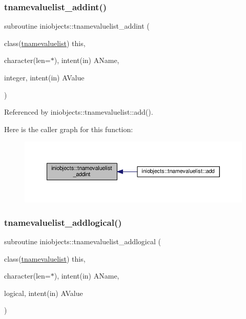 \subsubsection{\texorpdfstring{tnamevaluelist\+\_\+addint()}{tnamevaluelist\_addint()}}
{\footnotesize\ttfamily subroutine iniobjects\+::tnamevaluelist\+\_\+addint (\begin{DoxyParamCaption}\item[{class(\mbox{\hyperlink{structiniobjects_1_1tnamevaluelist}{tnamevaluelist}})}]{this,  }\item[{character(len=$\ast$), intent(in)}]{A\+Name,  }\item[{integer, intent(in)}]{A\+Value }\end{DoxyParamCaption})\hspace{0.3cm}{\ttfamily [private]}}



Referenced by iniobjects\+::tnamevaluelist\+::add().

Here is the caller graph for this function\+:
\nopagebreak
\begin{figure}[H]
\begin{center}
\leavevmode
\includegraphics[width=350pt]{namespaceiniobjects_a4c60c5afba93a368d2e832c9adbf6964_icgraph}
\end{center}
\end{figure}
\mbox{\label{namespaceiniobjects_a73327dd98a8e02b51bff94237d0cad1d}} 
\subsubsection{\texorpdfstring{tnamevaluelist\+\_\+addlogical()}{tnamevaluelist\_addlogical()}}
{\footnotesize\ttfamily subroutine iniobjects\+::tnamevaluelist\+\_\+addlogical (\begin{DoxyParamCaption}\item[{class(\mbox{\hyperlink{structiniobjects_1_1tnamevaluelist}{tnamevaluelist}})}]{this,  }\item[{character(len=$\ast$), intent(in)}]{A\+Name,  }\item[{logical, intent(in)}]{A\+Value }\end{DoxyParamCaption})\hspace{0.3cm}{\ttfamily [private]}}



